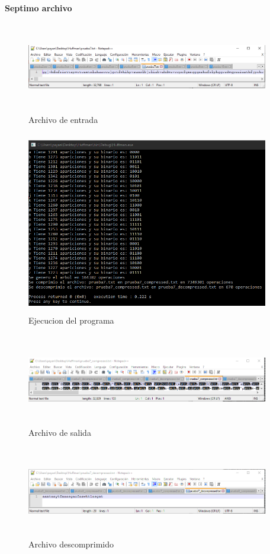 \documentclass[spanish]{article}
\begin{document}
	\textbf{Septimo archivo}
	\begin{figure}[H]
		\centering
		\includegraphics[width=400px,height=150px]{captura41}
		\caption{Archivo de entrada}
	\end{figure}
	\begin{figure}[H]
		\centering
		\includegraphics[width=400px,height=300px]{captura42}
		\caption{Ejecucion del programa}
	\end{figure}
	\begin{figure}[H]
		\centering
		\includegraphics[width=400px,height=150px]{captura43}
		\caption{Archivo de salida}
	\end{figure}
	\begin{figure}[H]
		\centering
		\includegraphics[width=400px,height=150px]{captura44}
		\caption{Archivo descomprimido}
	\end{figure}
\end{document}
